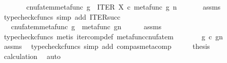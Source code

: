 \begin{isabellebody}
\ \ \isamarkupfalse%
\ \isamarkupfalse%
\ {\isachardoublequoteopen}{\isachardot}{\kern0pt}{\isachardot}{\kern0pt}{\isachardot}{\kern0pt}\ {\isacharequal}{\kern0pt}\ cnufatem{\isacharparenleft}{\kern0pt}metafunc\ g\ {\isasymbox}\ ITER\ X\ {\isasymcirc}\isactrlsub c\ {\isasymlangle}metafunc\ g{\isacharcomma}{\kern0pt}\ n\ {\isasymrangle}{\isacharparenright}{\kern0pt}{\isachardoublequoteclose}\isanewline
\ \ \ \ \isamarkupfalse%
\ assms\ \isamarkupfalse%
\ {\isacharparenleft}{\kern0pt}typecheck{\isacharunderscore}{\kern0pt}cfuncs{\isacharcomma}{\kern0pt}\ simp\ add{\isacharcolon}{\kern0pt}\ ITER{\isacharunderscore}{\kern0pt}succ{\isacharparenright}{\kern0pt}\isanewline
\ \ \isamarkupfalse%
\ \isamarkupfalse%
\ {\isachardoublequoteopen}{\isachardot}{\kern0pt}{\isachardot}{\kern0pt}{\isachardot}{\kern0pt}\ {\isacharequal}{\kern0pt}\ cnufatem{\isacharparenleft}{\kern0pt}metafunc\ g\ {\isasymbox}\ metafunc\ {\isacharparenleft}{\kern0pt}g\isactrlbsup {\isasymcirc}n\isactrlesup {\isacharparenright}{\kern0pt}{\isacharparenright}{\kern0pt}{\isachardoublequoteclose}\isanewline
\ \ \ \ \isamarkupfalse%
\ assms\ \isamarkupfalse%
\ {\isacharparenleft}{\kern0pt}typecheck{\isacharunderscore}{\kern0pt}cfuncs{\isacharcomma}{\kern0pt}\ metis\ iter{\isacharunderscore}{\kern0pt}comp{\isacharunderscore}{\kern0pt}def{}\ metafunc{\isacharunderscore}{\kern0pt}cnufatem{\isacharparenright}{\kern0pt}\isanewline
\ \ \isamarkupfalse%
\ \isamarkupfalse%
\ {\isachardoublequoteopen}{\isachardot}{\kern0pt}{\isachardot}{\kern0pt}{\isachardot}{\kern0pt}\ {\isacharequal}{\kern0pt}\ g\ {\isasymcirc}\isactrlsub c\ {\isacharparenleft}{\kern0pt}g\isactrlbsup {\isasymcirc}n\isactrlesup {\isacharparenright}{\kern0pt}{\isachardoublequoteclose}\isanewline
\ \ \ \ \isamarkupfalse%
\ assms\ \isamarkupfalse%
\ {\isacharparenleft}{\kern0pt}typecheck{\isacharunderscore}{\kern0pt}cfuncs{\isacharcomma}{\kern0pt}\ simp\ add{\isacharcolon}{\kern0pt}\ comp{\isacharunderscore}{\kern0pt}as{\isacharunderscore}{\kern0pt}metacomp{\isacharparenright}{\kern0pt}\isanewline
\ \ \isamarkupfalse%
\ \isamarkupfalse%
\ {\isacharquery}{\kern0pt}thesis\isanewline
\ \ \ \ \isamarkupfalse%
\ calculation\ \isamarkupfalse%
\ auto\isanewline
{}\isamarkupfalse%
%
\endisatagproof
{\isafoldproof}%
%
\isadelimproof
\isanewline
%
\endisadelimproof

\end{isabellebody}
